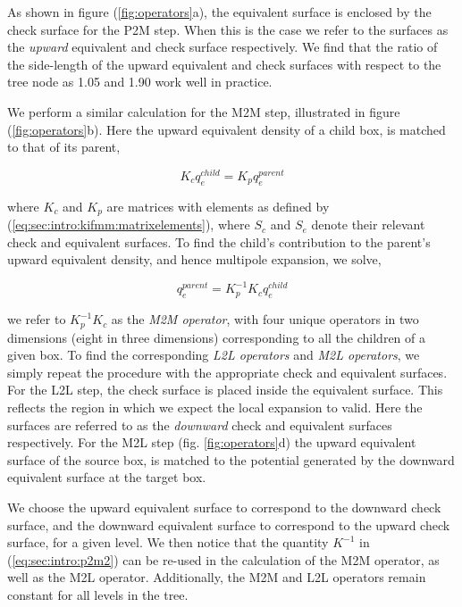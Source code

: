\documentclass{IEEEcsmag}
\begin{document}
As shown in figure (\ref{fig:operators}a), the equivalent surface is enclosed by the check surface for the P2M step. When this is the case we refer to the surfaces as the \textit{upward} equivalent and check surface respectively. We find that the ratio of the side-length of the upward equivalent and check surfaces with respect to the tree node as 1.05 and 1.90 work well in practice.

We perform a similar calculation for the M2M step, illustrated in figure (\ref{fig:operators}b). Here the upward equivalent density of a child box, is matched to that of its parent,

\begin{equation}
	K_c q_e^{child} = K_p q_e ^{parent}
\end{equation}

where $K_c$ and $K_p$ are matrices with elements as defined by (\ref{eq:sec:intro:kifmm:matrixelements}), where $S_c$ and $S_e$ denote their relevant check and equivalent surfaces. To find the child's contribution to the parent's upward equivalent density, and hence multipole expansion, we solve,

\begin{equation}
	q_e^{parent} = K_p^{-1}K_c q_e^{child}
\end{equation}

we refer to $K_p^{-1}K_c$ as the \textit{M2M operator}, with four unique operators in two dimensions (eight in three dimensions) corresponding to all the children of a given box. To find the corresponding \textit{L2L operators} and \textit{M2L operators}, we simply repeat the procedure with the appropriate check and equivalent surfaces. For the L2L step, the check surface is placed inside the equivalent surface. This reflects the region in which we expect the local expansion to valid. Here the surfaces are referred to as the \textit{downward} check and equivalent surfaces respectively. For the M2L step (fig. \ref{fig:operators}d) the upward equivalent surface of the source box, is matched to the potential generated by the downward equivalent surface at the target box.

We choose the upward equivalent surface to correspond to the downward check surface, and the downward equivalent surface to correspond to the upward check surface, for a given level. We then notice that the quantity $K^{-1}$ in (\ref{eq:sec:intro:p2m2}) can be re-used in the calculation of the M2M operator, as well as the M2L operator. Additionally, the M2M and L2L operators remain constant for all levels in the tree.
\end{document}
